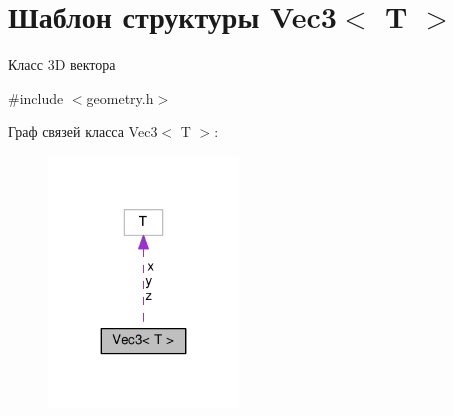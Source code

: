 \hypertarget{structVec3}{}\section{Шаблон структуры Vec3$<$ T $>$}
\label{structVec3}


Класс 3D вектора  




{\ttfamily \#include $<$geometry.\+h$>$}



Граф связей класса Vec3$<$ T $>$\+:\nopagebreak
\begin{figure}[H]
\begin{center}
\leavevmode
\includegraphics[width=143pt]{structVec3__coll__graph}
\end{center}
\end{figure}

